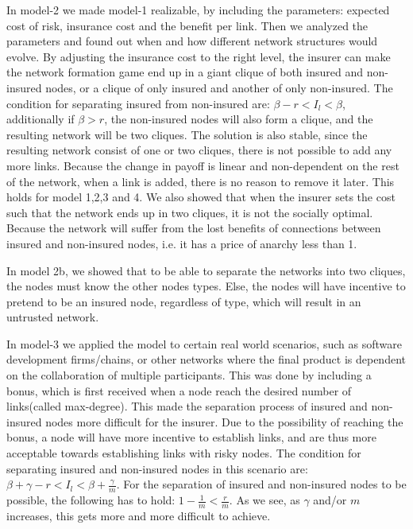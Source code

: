  In model-2 we made model-1 realizable, by including the parameters: expected cost of risk, insurance cost and the benefit per link. Then we analyzed the parameters and found out when and how different network structures would evolve. By adjusting the insurance cost to the right level, the insurer can make the network formation game end up in a giant clique of both insured and non-insured nodes, or a clique of only insured and another of only non-insured. The condition for separating insured from non-insured are: $\beta-r<I_{l}<\beta$, additionally if $\beta>r$, the non-insured nodes will also form a clique, and the resulting network will be two cliques. The solution is also stable, since the resulting network consist of one or two cliques, there is not possible to add any more links. Because the change in payoff is linear and non-dependent on the rest of the network, when a link is added, there is no reason to remove it later. This holds for model 1,2,3 and 4.
We also showed that when the insurer sets the cost such that the network ends up in two cliques, it is not the socially optimal. Because the network will suffer from the lost benefits of connections between insured and non-insured nodes, i.e. it has a price of anarchy less than 1. 

In model 2b, we showed that to be able to separate the networks into two cliques, the nodes must know the other nodes types. Else, the nodes will have incentive to pretend to be an insured node, regardless of type, which will result in an untrusted network.

In model-3 we applied the model to certain real world scenarios, such as software development firms/chains, or other networks where the final product is dependent on the collaboration of multiple participants.
This was done by including a bonus, which is first received when a node reach the desired number of links(called max-degree). This made the separation process of insured and non-insured nodes more difficult for the insurer. Due to the possibility of reaching the bonus, a node will have more incentive to establish links, and are thus more acceptable towards establishing links with risky nodes. The condition for separating insured and non-insured nodes in this scenario are: $\beta+\gamma-r<I_{l}<\beta+\frac{\gamma}{m}$. For the separation of insured and non-insured nodes to be possible, the following has to hold: $1-\frac{1}{m}<\frac{r}{m}$. As we see, as $\gamma$ and/or $m$ increases, this gets more and more difficult to achieve. 

